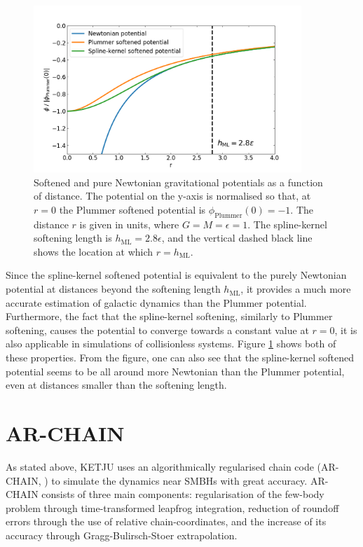 \documentclass[english, twoside]{HYgradu}
\begin{document}
\begin{figure}
	\centering	
	\includegraphics[width=0.9\textwidth]{softened_potentials.png}	
	\caption{Softened and pure Newtonian gravitational potentials as a function of distance. The potential on the y-axis is normalised so that, at $r=0$ the Plummer softened potential is $\phi_\mathrm{Plummer}(0) = -1$. The distance $r$ is given in units, where $G = M = \epsilon = 1$. The spline-kernel softening length is $h_\mathrm{ML} = 2.8 \epsilon$, and the vertical dashed black line shows the location at which $r = h_\mathrm{ML}$.}
	\label{figure:softened_potentials}
\end{figure}

Since the spline-kernel softened potential is equivalent to the purely Newtonian potential at distances beyond the softening length $h_\mathrm{ML}$, it provides a much more accurate estimation of galactic dynamics than the Plummer potential. Furthermore, the fact that the spline-kernel softening, similarly to Plummer softening, causes the potential to converge towards a constant value at $r=0$, it is also applicable in simulations of collisionless systems. Figure \ref{figure:softened_potentials} shows both of these properties. From the figure, one can also see that the spline-kernel softened potential seems to be all around more Newtonian than the Plummer potential, even at distances smaller than the softening length.


\section{AR-CHAIN} \label{section:ar-chain}

As stated above, KETJU uses an algorithmically regularised chain code (AR-CHAIN, \citealt{Mikkola2008ARCHAIN}) to simulate the dynamics near SMBHs with great accuracy. AR-CHAIN consists of three main components: regularisation of the few-body problem through time-transformed leapfrog integration, reduction of roundoff errors through the use of relative chain-coordinates, and the increase of its accuracy through Gragg-Bulirsch-Stoer extrapolation.
\end{document}
